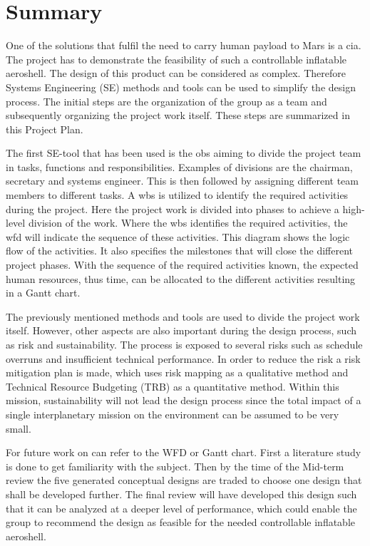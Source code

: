 \section*{Summary}\label{cha:summary}
One of the solutions that fulfil the need to carry human payload to Mars is a \gls{cia}. The project has to demonstrate the feasibility of such a controllable inflatable aeroshell. The design of this product can be considered as complex. Therefore Systems Engineering (SE) methods and tools can be used to simplify the design process. The initial steps are the organization of the group as a team and subsequently organizing the project work itself. These steps are summarized in this Project Plan.

The first SE-tool that has been used is the \gls{obs} aiming to divide the project team in tasks, functions and responsibilities. Examples of divisions are the chairman, secretary and systems engineer. This is then followed by assigning different team members to different tasks. A \gls{wbs} is utilized to identify the required activities during the project. Here the project work is divided into phases to achieve a high-level division of the work. Where the \gls{wbs} identifies the required activities, the \gls{wfd} will indicate the sequence of these activities. This diagram shows the logic flow of the activities. It also specifies the milestones that will close the different project phases. With the sequence of the required activities known, the expected human resources, thus time, can be allocated to the different activities resulting in a Gantt chart. 

The previously mentioned methods and tools are used to divide the project work itself. However, other aspects are also important during the design process, such as risk and sustainability. The process is exposed to several risks such as schedule overruns and insufficient technical performance. In order to reduce the risk a risk mitigation plan is made, which uses risk mapping as a qualitative method and Technical Resource Budgeting (TRB) as a quantitative method. Within this mission, sustainability will not lead the design process since the total impact of a single interplanetary mission on the environment can be assumed to be very small.

For future work on can refer to the WFD or Gantt chart. First a literature study is done to get familiarity with the subject. Then by the time of the Mid-term review the five generated conceptual designs are traded to choose one design that shall be developed further. The final review will have developed this design such that it can be analyzed at a deeper level of performance, which could enable the group to recommend the design as feasible for the needed controllable inflatable aeroshell.